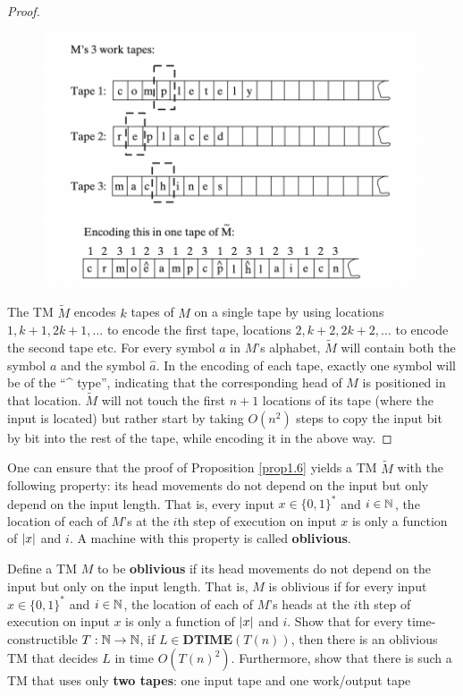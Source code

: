 \documentclass[11pt]{article}
\def \DTIME {\textbf{DTIME}}
\begin{document}
\begin{proof}
\begin{figure}[htbp]
\centering
\includegraphics[width=.6\textwidth]{./1.png}
\label{}
\end{figure}
The TM \(\tilde{M}\) encodes \(k\) tapes of \(M\) on a single tape by using
locations \(1,k+1,2k+1,\dots\) to encode the first tape, locations \(2,k+2,2k+2,\dots\) to
encode the second tape etc. For every symbol \(a\) in \(M\)'s alphabet, \(\tilde{M}\) will
contain both the symbol \(a\) and the symbol \(\hat{a}\). In the encoding of each tape, exactly
one symbol will be of the ``\^{} type'', indicating that the corresponding head of \(M\) is
positioned in that location. \(\tilde{M}\) will not touch the first \(n+1\) locations of its
tape (where the input is located) but rather start by taking \(O(n^2)\) steps to copy the input
bit by bit into the rest of the tape, while encoding it in the above way.
\end{proof}

\begin{remark}
One can ensure that the proof of Proposition \ref{prop1.6} yields a TM \(\tilde{M}\) with the
following property: its head movements do not depend on the input but only depend on the input
length. That is, every input \(x\in\{0,1\}^*\) and \(i\in\mathbb{N}\), the location of each of \(M\)'s
at the \(i\)th step of execution on input \(x\) is only a function of \(\abs{x}\) and \(i\). A
machine with this property is called \textbf{oblivious}.
\end{remark}

\begin{exercise}
\label{ex1.5}
Define a TM \(M\) to be \textbf{oblivious} if its head movements do not depend on the input but only on
the input length. That is, \(M\) is oblivious if for every input \(x\in\{0,1\}^*\) and \(i\in\mathbb{N}\), the
location of each of \(M\)'s heads at the \(i\)th step of execution on input \(x\) is only a
function of \(\abs{x}\) and \(i\). Show that for every time-constructible \(T:\mathbb{N}\to\mathbb{N}\),
if \(L\in\DTIME(T(n))\), then there is an oblivious TM that decides \(L\) in time \(O(T(n)^2)\).
Furthermore, show that there is such a TM that uses only \textbf{two tapes}: one input tape and one
work/output tape
\end{exercise}
\end{document}
